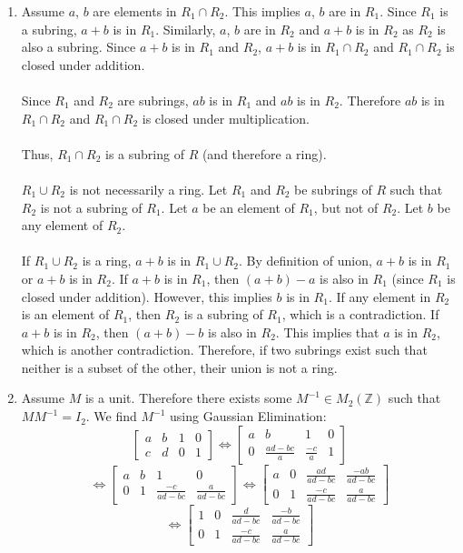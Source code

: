 \documentclass{article}
\begin{document}
\begin{enumerate}
\item Assume $a$, $b$ are elements in $R_1 \cap R_2$.  This implies $a$, $b$ are
in $R_1$.  Since $R_1$ is a subring, $a+b$ is in $R_1$.  Similarly, $a$, $b$ are
in $R_2$ and $a+b$ is in $R_2$ as $R_2$ is also a subring.  Since $a+b$ is in
$R_1$ and $R_2$, $a+b$ is in $R_1 \cap R_2$ and $R_1 \cap R_2$ is closed
under addition.
\\
\\
Since $R_1$ and $R_2$ are subrings, $ab$ is in $R_1$ and $ab$ is in $R_2$.
Therefore $ab$ is in $R_1 \cap R_2$ and $R_1 \cap R_2$ is closed under
multiplication.
\\
\\
Thus, $R_1 \cap R_2$ is a subring of $R$ (and therefore a ring).
\\
\\
$R_1 \cup R_2$ is not necessarily a ring.  Let $R_1$ and $R_2$ be
 subrings of $R$ such that $R_2$ is not a subring of $R_1$.  Let $a$ be an
 element of $R_1$, but not of $R_2$.  Let $b$ be any element of $R_2$.
 \\
 \\
 If $R_1 \cup R_2$ is a ring, $a+b$ is in $R_1 \cup R_2$.  By definition of
 union, $a+b$ is in $R_1$ or $a+b$ is in $R_2$.  If $a+b$ is in $R_1$, then
 $(a+b)-a$ is also in $R_1$ (since $R_1$ is closed under addition).  However,
 this implies $b$ is in $R_1$.  If any element in $R_2$ is an element of $R_1$,
 then $R_2$ is a subring of $R_1$, which is a contradiction.  If $a+b$ is in
 $R_2$, then $(a+b)-b$ is also in $R_2$.  This implies that $a$ is in $R_2$,
 which is another contradiction.  Therefore, if two subrings exist such that
 neither is a subset of the other, their union is not a ring.

\item Assume $M$ is a unit.  Therefore there exists some $M^{-1} \in M_2(\mathbb{Z})$
such that $MM^{-1} = I_2$.  We find $M^{-1}$ using Gaussian Elimination:
\[
\left[
\begin{array}{cc|cc}
a & b & 1 & 0 \\
c & d & 0 & 1
\end{array}
\right]
\Leftrightarrow
\left[
\begin{array}{cc|cc}
a & b & 1 & 0 \\
0 & \frac{ad-bc}{a} & \frac{-c}{a} & 1
\end{array}
\right]
\]
\[
\Leftrightarrow
\left[
\begin{array}{cc|cc}
a & b & 1 & 0 \\
0 & 1 & \frac{-c}{ad-bc} & \frac{a}{ad-bc}
\end{array}
\right]
\Leftrightarrow
\left[
\begin{array}{cc|cc}
a & 0 & \frac{ad}{ad-bc} & \frac{-ab}{ad-bc} \\
0 & 1 & \frac{-c}{ad-bc} & \frac{a}{ad-bc}
\end{array}
\right]
\]
\[
\Leftrightarrow
\left[
\begin{array}{cc|cc}
1 & 0 & \frac{d}{ad-bc} & \frac{-b}{ad-bc} \\
0 & 1 & \frac{-c}{ad-bc} & \frac{a}{ad-bc}
\end{array}
\right]
\]


\end{enumerate}
\end{document}
